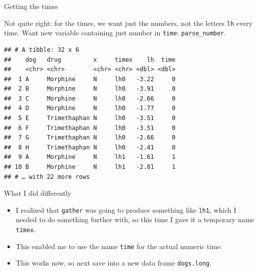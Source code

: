 \documentclass[ignorenonframetext,]{beamer}
\newenvironment{Shaded}{\begin{snugshade}}{\end{snugshade}}
\newcommand{\DataTypeTok}[1]{\textcolor[rgb]{0.13,0.29,0.53}{#1}}
\newcommand{\DecValTok}[1]{\textcolor[rgb]{0.00,0.00,0.81}{#1}}
\newcommand{\KeywordTok}[1]{\textcolor[rgb]{0.13,0.29,0.53}{\textbf{#1}}}
\newcommand{\NormalTok}[1]{#1}
\newcommand{\OperatorTok}[1]{\textcolor[rgb]{0.81,0.36,0.00}{\textbf{#1}}}
\newcommand{\StringTok}[1]{\textcolor[rgb]{0.31,0.60,0.02}{#1}}
\begin{document}
\begin{frame}[fragile]{Getting the times}
\protect\hypertarget{getting-the-times}{}

Not quite right: for the times, we want just the numbers, not the
letters \texttt{lh} every time. Want new variable containing just number
in \texttt{time}: \texttt{parse\_number}.

\begin{Shaded}
\end{Shaded}

\begin{verbatim}
## # A tibble: 32 x 6
##    dog   drug         x     timex    lh  time
##    <chr> <chr>        <chr> <chr> <dbl> <dbl>
##  1 A     Morphine     N     lh0   -3.22     0
##  2 B     Morphine     N     lh0   -3.91     0
##  3 C     Morphine     N     lh0   -2.66     0
##  4 D     Morphine     N     lh0   -1.77     0
##  5 E     Trimethaphan N     lh0   -3.51     0
##  6 F     Trimethaphan N     lh0   -3.51     0
##  7 G     Trimethaphan N     lh0   -2.66     0
##  8 H     Trimethaphan N     lh0   -2.41     0
##  9 A     Morphine     N     lh1   -1.61     1
## 10 B     Morphine     N     lh1   -2.81     1
## # … with 22 more rows
\end{verbatim}

\end{frame}

\begin{frame}[fragile]{What I did differently}
\protect\hypertarget{what-i-did-differently}{}

\begin{itemize}
\item
  I realized that \texttt{gather} was going to produce something like
  \texttt{lh1}, which I needed to do something further with, so this
  time I gave it a temporary name \texttt{timex}.
\item
  This enabled me to use the name \texttt{time} for the actual numeric
  time.
\item
  This works now, so next save into a new data frame \texttt{dogs.long}.
\end{itemize}

\end{frame}
\end{document}
